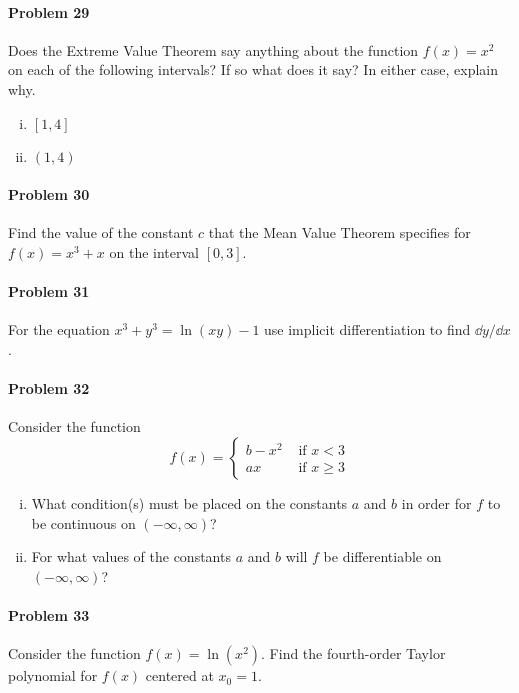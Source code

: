 \documentclass[a4paper, 11pt]{article}
\begin{document}
\paragraph{Problem 29}
Does the Extreme Value Theorem say anything about the function $f(x) = x^2$ on each of the following intervals? If so what does it say?  In either case, explain why.
\begin{enumerate}[(i)]
	\item $[1,4]$
	\item $(1,4)$
\end{enumerate}

\paragraph{Problem 30}
Find the value of the constant $c$ that the Mean Value Theorem specifies for $f(x)=x^3 + x$ on the interval $[0,3]$.


\paragraph{Problem 31}
For the equation $x^3 + y^3 = \ln(xy) - 1$ use implicit differentiation to find $\dd y/ \dd x$.


\paragraph{Problem 32}
Consider the function
\[
	f(x) = \begin{cases}
				b-x^2 & \text{ if } x < 3 \\
				ax & \text{ if } x \geq 3
	 	   \end{cases}
\]
\begin{enumerate}[(i)]
	\item What condition(s) must be placed on the constants $a$ and $b$ in order for $f$ to be continuous on $(-\infty, \infty)$?
	\item For what values of the constants $a$ and $b$ will $f$ be differentiable on $(-\infty, \infty)$?
\end{enumerate}


\paragraph{Problem 33}
Consider the function $f(x) = \ln(x^2)$.
Find the fourth-order Taylor polynomial for $f(x)$ centered at $x_0=1$.
\end{document}
